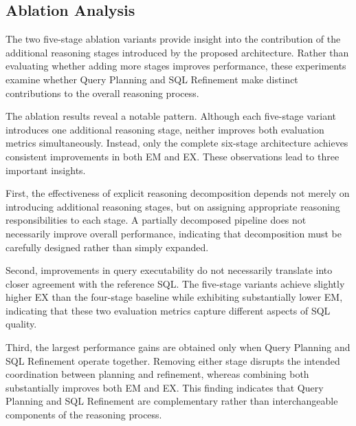 \documentclass{svproc}
\begin{document}
\subsection{Ablation Analysis}
\label{subsec:ablation}

The two five-stage ablation variants provide insight into the contribution of the additional reasoning stages introduced by the proposed architecture. Rather than evaluating whether adding more stages improves performance, these experiments examine whether Query Planning and SQL Refinement make distinct contributions to the overall reasoning process.


The ablation results reveal a notable pattern. Although each five-stage variant introduces one additional reasoning stage, neither improves both evaluation metrics simultaneously. Instead, only the complete six-stage architecture achieves consistent improvements in both EM and EX. These observations lead to three important insights.

First, the effectiveness of explicit reasoning decomposition depends not merely on introducing additional reasoning stages, but on assigning appropriate reasoning responsibilities to each stage. A partially decomposed pipeline does not necessarily improve overall performance, indicating that decomposition must be carefully designed rather than simply expanded.

Second, improvements in query executability do not necessarily translate into closer agreement with the reference SQL. The five-stage variants achieve slightly higher EX than the four-stage baseline while exhibiting substantially lower EM, indicating that these two evaluation metrics capture different aspects of SQL quality.


Third, the largest performance gains are obtained only when Query Planning and SQL Refinement operate together. Removing either stage disrupts the intended coordination between planning and refinement, whereas combining both substantially improves both EM and EX. This finding indicates that Query Planning and SQL Refinement are complementary rather than interchangeable components of the reasoning process.
\end{document}

